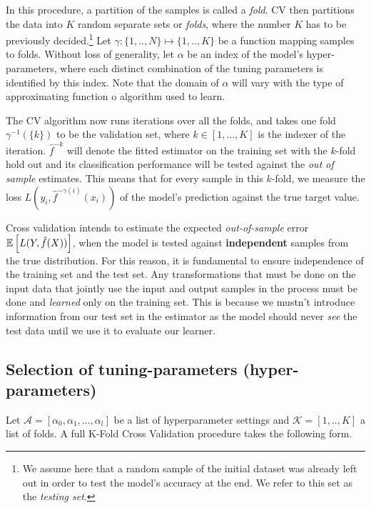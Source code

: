 In this procedure, a partition of the samples is called a \textit{fold}.
CV then partitions the data into $K$ random separate sets or  \textit{folds}, where the number $K$ has to be previously decided.\footnote{ We assume here that a random sample of the initial dataset was already left out in order to test the model's accuracy at the end.
We refer to this set as the \textit{testing set}.} Let $\gamma : \{1,..,N\} \mapsto \{1, .., K\}$ be a function mapping samples to folds.
Without loss of generality, let $\alpha$ be an index of the model's hyper-parameters, where each distinct combination of the tuning parameters is identified by this index.
Note that the domain of $\alpha$ will vary with the type of approximating function o algorithm used to learn.

 The CV algorithm now runs iterations over all the folds, and takes one fold $\gamma^{-1}(\{k\})$ to be the validation set, where $k \in [1,\ldots,K]$ is the indexer of the iteration.
$\hat{f}^{-k}$ will denote the fitted estimator on the training set with the $k$-fold hold out and its classification performance will be tested against the \textit{out of sample} estimates.
This means that for every sample in this $k$-fold, we measure the loss $L(y_i, \hat{f}^{-\gamma(i)}(x_i))$ of the model's prediction against the true target value.

Cross validation intends to estimate the expected \textit{out-of-sample} error $\operatorname{\mathbb{E}} \left[ L(Y, \hat{f}(X)) \right]$, when the model is tested against \textbf{independent} samples from the true distribution.
For this reason, it is fundamental to ensure independence of the training set and the test set.
Any transformations that must be done on the input data that jointly use the input and output samples in the process must be done and \textit{learned} only on the training set.
This is because we mustn't introduce information from our test set in the estimator as the model should never \textit{see} the test data until we use it to evaluate our learner.

\subsection{Selection of tuning-parameters (hyper-parameters) }\label{subsection:selection_hyper_params}

 Let $\mathcal{A} = [\alpha_0, \alpha_1,\ldots, \alpha_l  ]$ be a list of hyperparameter settings and $\mathcal{K} =[1,..,K]$ a list of folds.
A full K-Fold Cross Validation procedure takes the following form.

